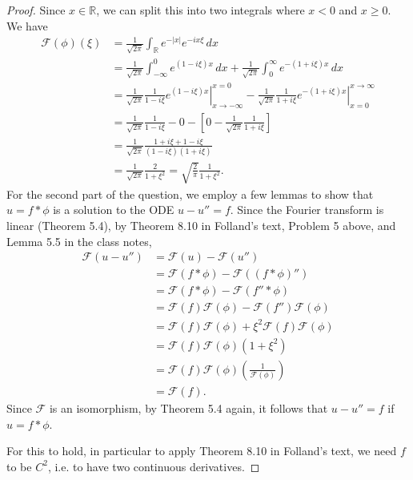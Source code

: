 \documentclass[11pt,oneside,english]{amsart}
\theoremstyle{definition}
\newcommand{\MC}[1]{\mathcal{#1}}
\newcommand{\MB}[1]{\mathbb{#1}}
\begin{document}
\begin{enumerate}
\begin{proof}
Since $x\in \MB{R}$, we can split this into two integrals where $x<0$ and $x\geq 0$. We have
\begin{align*}
\MC{F}(\phi)(\xi)&=\frac{1}{\sqrt{2\pi}}\int_\MB{R}e^{-|x|}e^{-ix\xi}\,dx\\[2mm]
&=\frac{1}{\sqrt{2\pi}}\int_{-\infty}^0 e^{(1-i\xi)x}\,dx+\frac{1}{\sqrt{2\pi}}\int_0^\infty e^{-(1+i\xi)x}\,dx\\[2mm]
&=\frac{1}{\sqrt{2\pi}}\left.\frac{1}{1-i\xi}e^{(1-i\xi)x}\right|_{x\to-\infty}^{x=0}-\frac{1}{\sqrt{2\pi}}\left.\frac{1}{1+i\xi}e^{-(1+i\xi)x}\right|_{x=0}^{x\to\infty}\\[2mm]
&=\frac{1}{\sqrt{2\pi}}\frac{1}{1-i\xi}-0-\left[0-\frac{1}{\sqrt{2\pi}}\frac{1}{1+i\xi}\right]\\[2mm]
&=\frac{1}{\sqrt{2\pi}}\frac{1+i\xi+1-i\xi}{(1-i\xi)(1+i\xi)}\\[2mm]
&=\frac{1}{\sqrt{2\pi}}\frac{2}{1+\xi^2}=\sqrt{\frac{2}{\pi}}\frac{1}{1+\xi^2}.
\end{align*}
For the second part of the question, we employ a few lemmas to show that $u=f*\phi$ is a solution to the ODE $u-u''=f$. Since the Fourier transform is linear (Theorem 5.4), by Theorem 8.10 in Folland's text, Problem 5 above, and Lemma 5.5 in the class notes,
\begin{align*}
\MC{F}(u-u'')&=\MC{F}(u)-\MC{F}(u'')\\[2mm]
&=\MC{F}(f*\phi)-\MC{F}((f*\phi)'')\\[2mm]
&=\MC{F}(f*\phi)-\MC{F}(f''*\phi)\\[2mm]
&=\MC{F}(f)\MC{F}(\phi)-\MC{F}(f'')\MC{F}(\phi)\\[2mm]
&=\MC{F}(f)\MC{F}(\phi)+\xi^2\MC{F}(f)\MC{F}(\phi)\\[2mm]
&=\MC{F}(f)\MC{F}(\phi)(1+\xi^2)\\[2mm]
&=\MC{F}(f)\MC{F}(\phi)\left(\frac{1}{\MC{F}(\phi)}\right)\\[2mm]
&=\MC{F}(f).
\end{align*}
Since $\MC{F}$ is an isomorphism, by Theorem 5.4 again, it follows that $u-u''=f$ if $u=f*\phi$.

For this to hold, in particular to apply Theorem 8.10 in Folland's text, we need $f$ to be $C^2$, i.e. to have two continuous derivatives.
\end{proof}











\end{enumerate}
\end{document}
